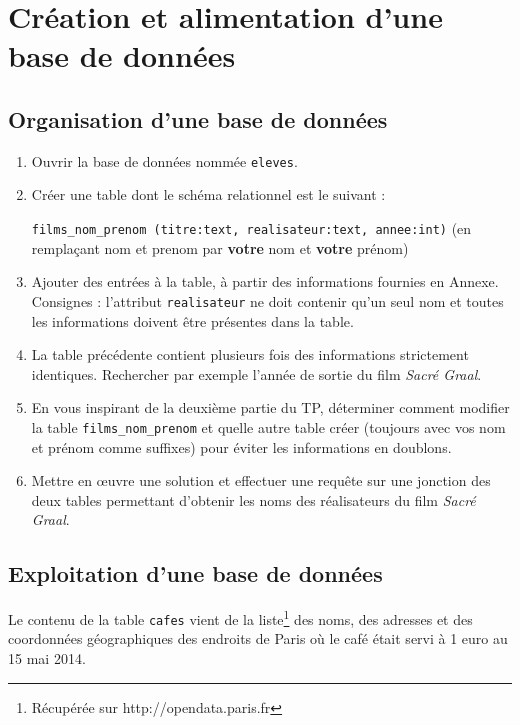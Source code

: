 \section{Création et alimentation d'une base de données}
\subsection{Organisation d'une base de données}

\begin{enumerate}
  \item Ouvrir la base de données nommée \verb|eleves|. 
  \item Créer une table dont le schéma relationnel est le suivant :

  \verb|films_nom_prenom (titre:text, realisateur:text, annee:int)| (en remplaçant nom et prenom par \textbf{votre} nom et \textbf{votre} prénom)
   
  \item Ajouter des entrées à la table, à partir des informations fournies en Annexe. Consignes : l'attribut \verb|realisateur| ne doit contenir qu'un seul nom et toutes les informations doivent être présentes dans la table.

  \item La table précédente contient plusieurs fois des informations strictement identiques. Rechercher par exemple l'année de sortie du film \textit{Sacré Graal}.
  
  \item En vous inspirant de la deuxième partie du TP, déterminer comment modifier la table \verb|films_nom_prenom| et quelle autre table créer (toujours avec vos nom et prénom comme suffixes) pour éviter les informations en doublons.
  
  \item Mettre en œuvre une solution et effectuer une requête sur une jonction des deux tables permettant d'obtenir les noms des réalisateurs du film \textit{Sacré Graal}.
\end{enumerate}

\subsection{Exploitation d'une base de données}

Le contenu de la table \verb|cafes| vient de la liste\footnote{Récupérée sur http://opendata.paris.fr} des noms, des adresses et des coordonnées géographiques des endroits de Paris où le café était servi à 1 euro au 15 mai 2014.

